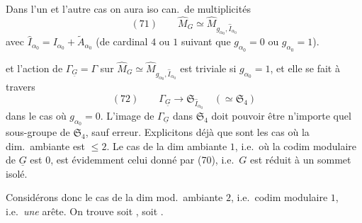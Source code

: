 \documentclass[11pt,a4paper]{article}
\begin{document}
Dans l'un et l'autre cas  on aura  iso can.\ de multiplicités
\[
(71)\qquad \widehat{M}_G \simeq \widehat{M}_{g_{\alpha_0}, \hat{I}_{\alpha_0}}
\]
avec $\hat{I}_{\alpha_0} = I_{\alpha_0} + \widetilde{A}_{\alpha_0}$ (de cardinal $4$ ou $1$ suivant que $g_{\alpha_0} = 0$ ou $g_{\alpha_0} = 1$).

\struck{\ill{}} et l'action de $\Gamma_{\underline{G}} = \Gamma$ sur $\widehat{M}_G \simeq \widehat{M}_{g_{\alpha_0}, \hat{I}_{\alpha_0}}$ est triviale si $g_{\alpha_0} = 1$, et elle se fait à travers
\[
(72)\qquad \Gamma_{\underline{G}} \longrightarrow \mathfrak{S}_{\hat{I}_{\alpha_0}} \quad (\simeq \mathfrak{S}_4)
\]
dans le cas où $g_{\alpha_0} = 0$. L'image de $\Gamma_{\underline{G}}$ dans $\mathfrak{S}_4$ doit pouvoir être n'importe quel sous-groupe de $\mathfrak{S}_4$, sauf erreur. Explicitons déjà que sont les cas où la dim.\ ambiante est $\leqslant 2$. Le cas de la dim ambiante $1$, i.e.\ où la codim modulaire  de $\underline{G}$ est $0$, est évidemment celui donné par (70), i.e.\ $G$ est réduit à un sommet isolé.

Considérons donc le cas de la dim mod.\ ambiante $2$, i.e.\ codim modulaire $1$, i.e.\ \emph{une} arête. On trouve soit , soit .
\end{document}
